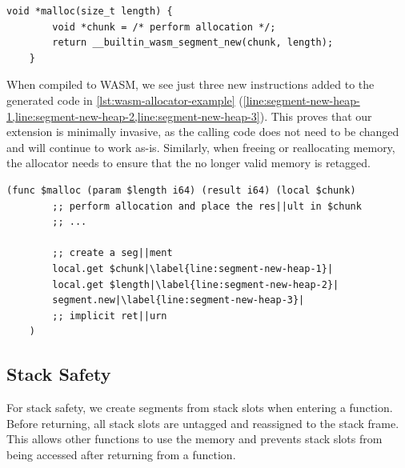 \begin{lstfloat}
    \begin{lstlisting}[frame=h,style=customc,
        label={lst:heap-allocator-example-inner}]
    void *malloc(size_t length) {
        void *chunk = /* perform allocation */;
        return __builtin_wasm_segment_new(chunk, length);
    }
    \end{lstlisting}
    \caption{Example of a malloc implementation utilizing the memory safety extension.}
    \label{lst:heap-allocator-example}
\end{lstfloat}

\noindent
When compiled to \ac{WASM}, we see just three new instructions added to the generated code in \cref{lst:wasm-allocator-example} (\cref{line:segment-new-heap-1,line:segment-new-heap-2,line:segment-new-heap-3}).
This proves that our extension is minimally invasive, as the calling code does not need to be changed and will continue to work as-is.
Similarly, when freeing or reallocating memory, the allocator needs to ensure that the no longer valid memory is retagged.

\begin{lstfloat}
    \begin{lstlisting}[frame=h,style=customwasm,
        label={lst:wasm-allocator-example-inner},escapechar=|]
    (func $malloc (param $length i64) (result i64) (local $chunk)
        ;; perform allocation and place the res||ult in $chunk
        ;; ...

        ;; create a seg||ment
        local.get $chunk|\label{line:segment-new-heap-1}|
        local.get $length|\label{line:segment-new-heap-2}|
        segment.new|\label{line:segment-new-heap-3}|
        ;; implicit ret||urn
    )
    \end{lstlisting}
    \caption{Generated \ac{WASM} for code from \cref{lst:heap-allocator-example}.}
    \label{lst:wasm-allocator-example}
\end{lstfloat}

\subsection{Stack Safety}
\label{subsec:stack-safety}

For stack safety, we create segments from stack slots when entering a function.
Before returning, all stack slots are untagged and reassigned to the stack frame.
This allows other functions to use the memory and prevents stack slots from being accessed after returning from a function.

